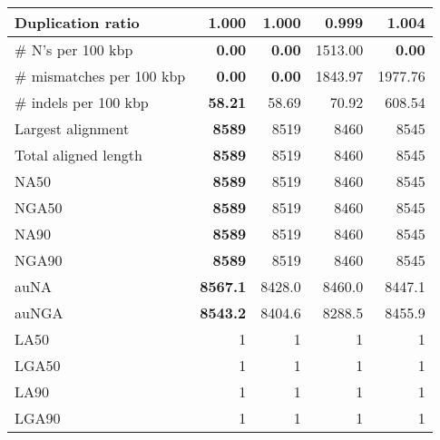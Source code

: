 \documentclass[12pt,a4paper]{article}
\begin{document}
\begin{table}[ht]
\begin{center}
\begin{tabular}{|l*{4}{|r}|}
Duplication ratio & 1.000 & 1.000 & {\bf 0.999} & 1.004 \\ \hline
\# N's per 100 kbp & {\bf 0.00} & {\bf 0.00} & 1513.00 & {\bf 0.00} \\ \hline
\# mismatches per 100 kbp & {\bf 0.00} & {\bf 0.00} & 1843.97 & 1977.76 \\ \hline
\# indels per 100 kbp & {\bf 58.21} & 58.69 & 70.92 & 608.54 \\ \hline
Largest alignment & {\bf 8589} & 8519 & 8460 & 8545 \\ \hline
Total aligned length & {\bf 8589} & 8519 & 8460 & 8545 \\ \hline
NA50 & {\bf 8589} & 8519 & 8460 & 8545 \\ \hline
NGA50 & {\bf 8589} & 8519 & 8460 & 8545 \\ \hline
NA90 & {\bf 8589} & 8519 & 8460 & 8545 \\ \hline
NGA90 & {\bf 8589} & 8519 & 8460 & 8545 \\ \hline
auNA & {\bf 8567.1} & 8428.0 & 8460.0 & 8447.1 \\ \hline
auNGA & {\bf 8543.2} & 8404.6 & 8288.5 & 8455.9 \\ \hline
LA50 & 1 & 1 & 1 & 1 \\ \hline
LGA50 & 1 & 1 & 1 & 1 \\ \hline
LA90 & 1 & 1 & 1 & 1 \\ \hline
LGA90 & 1 & 1 & 1 & 1 \\ \hline
\end{tabular}
\end{center}
\end{table}
\end{document}
